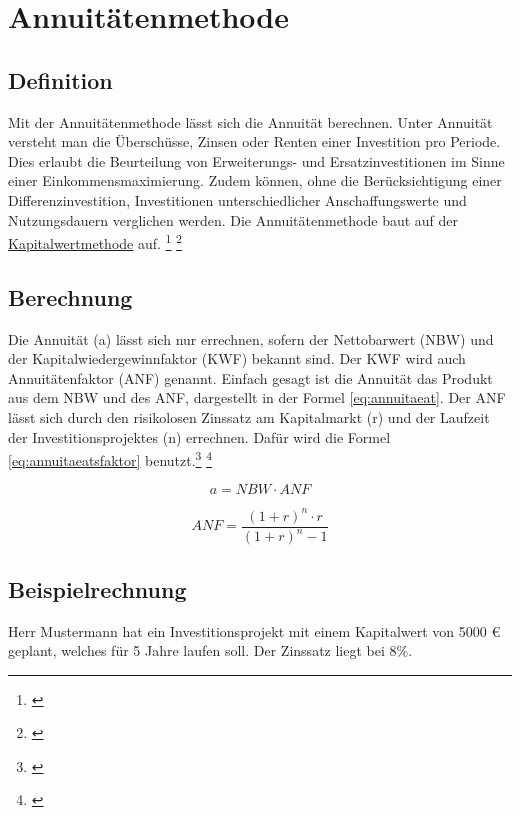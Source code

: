 \chapter{Annuitätenmethode}
\label{Annuitaetenmethode}

\section{Definition}

Mit der Annuitätenmethode lässt sich die Annuität berechnen. Unter Annuität versteht man die Überschüsse, Zinsen oder Renten einer Investition pro Periode. Dies erlaubt die Beurteilung von Erweiterungs- und Ersatzinvestitionen im Sinne einer Einkommensmaximierung. Zudem können, ohne die Berücksichtigung einer Differenzinvestition, Investitionen unterschiedlicher Anschaffungswerte und Nutzungsdauern verglichen werden. Die Annuitätenmethode baut auf der \hyperref[Kapitalwertmethode]{Kapitalwertmethode} auf. \footnote{\cite{bwllexicon-annu}} \footnote{\cite{wikipedia-annu}}

\section{Berechnung}

Die Annuität (a) lässt sich nur errechnen, sofern der Nettobarwert (NBW) und der Kapitalwiedergewinnfaktor (KWF) bekannt sind. Der KWF wird auch Annuitätenfaktor (ANF) genannt. Einfach gesagt ist die Annuität das Produkt aus dem NBW und des ANF, dargestellt in der Formel \eqref{eq:annuitaeat}. Der ANF lässt sich durch den risikolosen Zinssatz am Kapitalmarkt (r) und der Laufzeit der Investitionsprojektes (n) errechnen. Dafür wird die Formel \eqref{eq:annuitaeatsfaktor} benutzt.\footnote{\cite{studyflix-annu}} \footnote{\cite{bwllexicon-annu}}

\begin{equation}
    a = NBW \cdot ANF
    \label{eq:annuitaeat}
\end{equation}

\begin{equation}
    ANF = \frac{ (1 + r)^n \cdot r }{ (1 + r)^n - 1 }
    \label{eq:annuitaeatsfaktor}
\end{equation}

\section{Beispielrechnung}

Herr Mustermann hat ein Investitionsprojekt mit einem Kapitalwert von 5000 € geplant, welches für 5 Jahre laufen soll. Der Zinssatz liegt bei 8\%.


